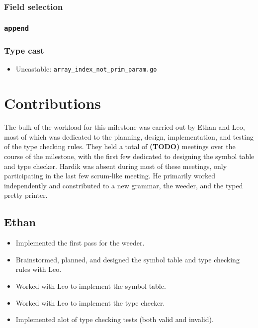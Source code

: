 \documentclass{article}
\begin{document}
\subsubsection*{Field selection}
\subsubsection*{\texttt{append}}
\subsubsection*{Type cast}

\begin{itemize}
\item Uncastable: \texttt{array_index_not_prim_param.go}
\end{itemize}

\section*{Contributions}

The bulk of the workload for this milestone was carried out by Ethan and Leo, most of which was dedicated to the planning, design, implementation, and testing of the type checking rules.
They held a total of \textbf{(TODO)} meetings over the course of the milestone, with the first few dedicated to designing the symbol table and type checker.
Hardik was absent during most of these meetings, only participating in the last few scrum-like meeting.
He primarily worked independently and constributed to a new grammar, the weeder, and the typed pretty printer.

\subsection*{Ethan}

\begin{itemize}
    \item Implemented the first pass for the weeder.
    \item Brainstormed, planned, and designed the symbol table and type checking rules with Leo.
    \item Worked with Leo to implement the symbol table.
    \item Worked with Leo to implement the type checker.
    \item Implemented alot of type checking tests (both valid and invalid).
\end{itemize}
\end{document}
